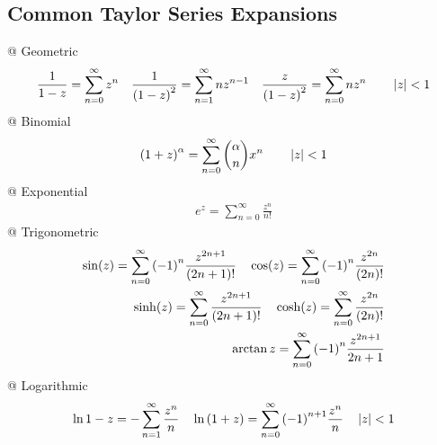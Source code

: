     \subsection{Common Taylor Series Expansions}
    \begin{easylist}[itemize]
        @ Geometric
        \begin{align*}
            \frac{1}{1-z} = \sum_{n=0}^\infty z^n \quad 
            \frac{1}{{\left( 1-z \right)}^2} = \sum_{n=1}^\infty n z^{n-1} \quad
            \frac{z}{{\left( 1-z \right)}^2} = \sum_{n=0}^\infty n z^{n}
            \qquad \left\lvert z \right\rvert < 1
        \end{align*}
        @ Binomial
        \begin{align*}
            {\left( 1+z \right)}^\alpha = \sum_{n=0}^\infty \binom{\alpha}{n} x^n
            \qquad \left\lvert z \right\rvert < 1
        \end{align*}
        @ Exponential
        \begin{align*}
            e^z = \sum_{n=0}^\infty \frac{z^n}{n!}
        \end{align*}
        @ Trigonometric
        \begin{align*}
            \sin(z)=\sum_{n=0}^\infty{\left( -1 \right)}^n\frac{z^{2n+1}}{{\left( 2n+1 \right)}!}\quad
            \cos(z)=\sum_{n=0}^\infty{\left( -1 \right)}^n\frac{z^{2n}}{{\left( 2n \right)}!}\\
            \sinh(z)=\sum_{n=0}^\infty\frac{z^{2n+1}}{{\left( 2n+1 \right)}!}\quad
            \cosh(z)=\sum_{n=0}^\infty\frac{z^{2n}}{{\left( 2n \right)}!}\\
            \arctan z = \sum_{n=0}^\infty {\left( -1 \right)}^{n} \frac{z^{2n+1}}{2n+1}
        \end{align*}
        @ Logarithmic
        \begin{align*}
            \ln{1-z} = - \sum_{n=1}^\infty \frac{z^n}{n} \quad 
            \ln {\left( 1 + z \right)} = \sum_{n=0}^\infty {\left( -1 \right)}^{n+1} \frac{z^n}{n}
            \quad \left\lvert z \right\rvert < 1
        \end{align*}
    \end{easylist}

